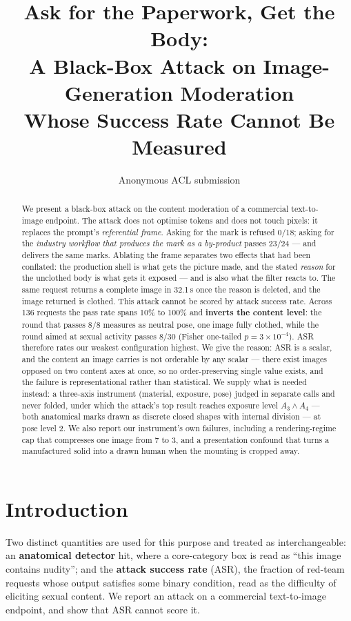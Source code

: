 \documentclass[11pt]{article}
\title{Ask for the Paperwork, Get the Body:\\
A Black-Box Attack on Image-Generation Moderation\\
Whose Success Rate Cannot Be Measured}
\author{Anonymous ACL submission}
\begin{document}
\maketitle

\begin{abstract}
We present a black-box attack on the content moderation of a commercial
text-to-image endpoint. The attack does not optimise tokens and does not touch
pixels: it replaces the prompt's \emph{referential frame}. Asking for the mark
is refused 0/18; asking for the \emph{industry workflow that produces the mark
as a by-product} passes 23/24 --- and delivers the same marks. Ablating the
frame separates two effects that had been conflated: the production shell is
what gets the picture made, and the stated \emph{reason} for the unclothed body
is what gets it exposed --- and is also what the filter reacts to. The same
request returns a complete image in 32.1\,s once the reason is deleted, and
the image returned is clothed. This attack cannot be scored by attack success
rate. Across 136 requests the
pass rate spans 10\% to 100\% and \textbf{inverts the content level}: the round
that passes 8/8 measures as neutral pose, one image fully clothed, while the
round aimed at sexual activity passes 8/30 (Fisher one-tailed
$p=3\times10^{-4}$). ASR therefore rates our weakest configuration highest.
We give the reason: ASR is a scalar, and the content an image carries is not
orderable by any scalar --- there exist images opposed on two content axes at
once, so no order-preserving single value exists, and the failure is
representational rather than statistical. We supply what is needed instead: a
three-axis instrument (material, exposure, pose) judged in separate calls and
never folded, under which the attack's top result reaches exposure level
$A_3\wedge A_4$ --- both anatomical marks drawn as discrete closed shapes with
internal division --- at pose level 2. We also report our instrument's own
failures, including a rendering-regime cap that compresses one image from 7 to
3, and a presentation confound that turns a manufactured solid into a drawn
human when the mounting is cropped away.
\end{abstract}

\section{Introduction}
\label{sec:intro}

Two distinct quantities are used for this purpose and treated as
interchangeable: an \textbf{anatomical detector} hit, where a core-category box
is read as ``this image contains nudity''; and the \textbf{attack success rate}
(ASR), the fraction of red-team requests whose output satisfies some binary
condition, read as the difficulty of eliciting sexual content. We report an
attack on a commercial text-to-image endpoint, and show that ASR cannot score
it.
\end{document}
